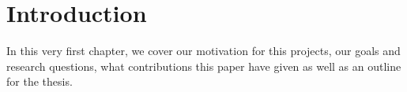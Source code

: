 \chapter{Introduction}
\label{chap:introduction}

In this very first chapter, we cover our motivation for this projects, our goals and research questions, what contributions this paper have given as well as an outline for the thesis.









